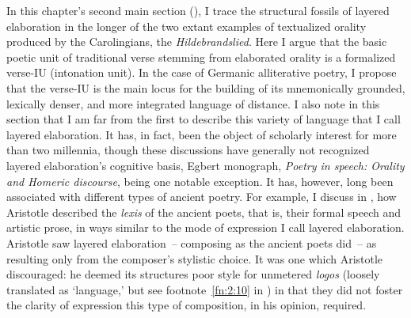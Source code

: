 In this chapter’s second main section (), I trace the structural fossils of layered elaboration in the longer of the two extant examples of textualized orality produced by the Carolingians, the \textit{Hildebrandslied}. Here I argue that the basic poetic unit of traditional verse stemming from elaborated orality is a formalized verse-IU (intonation unit). In the case of Germanic alliterative poetry, I propose that the verse-IU is the main locus for the building of its mnemonically grounded, lexically denser, and more integrated language of distance. I also note in this section that I am far from the first to describe this variety of language that I call layered elaboration. It has, in fact, been the object of scholarly interest for more than two millennia, though these discussions have generally not recognized layered elaboration’s cognitive basis, Egbert  monograph, \textit{Poetry in speech: Orality and Homeric discourse}, being one notable exception. It has, however, long been associated with different types of ancient poetry. For example, I discuss in , how Aristotle described the \textit{lexis} of the ancient poets, that is, their formal speech and artistic prose, in ways similar to the mode of expression I call layered elaboration. Aristotle saw layered elaboration~-- composing as the ancient poets did~-- as resulting only from the composer’s stylistic choice. It was one which Aristotle discouraged: he deemed its structures poor style for unmetered \textit{logos} (loosely translated as ‘language,’ but see footnote~\ref{fn:2:10} in ) in that they did not foster the clarity of expression this type of composition, in his opinion, required.

